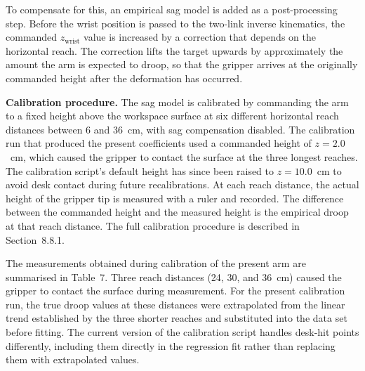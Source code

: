 To compensate for this, an empirical sag model is added as a 
post-processing step. Before the wrist position is passed to the 
two-link inverse kinematics, the commanded $z_{\mathrm{wrist}}$ 
value is increased by a correction that depends on the horizontal 
reach. The correction lifts the target upwards by approximately 
the amount the arm is expected to droop, so that the gripper 
arrives at the originally commanded height after the deformation 
has occurred.

\textbf{Calibration procedure.} The sag model is calibrated by
commanding the arm to a fixed height above the workspace surface
at six different horizontal reach distances between 6 and
36~cm, with sag compensation disabled. The calibration run
that produced the present coefficients used a commanded height
of $z = 2.0$~cm, which caused the gripper to contact the
surface at the three longest reaches. The calibration script's
default height has since been raised to $z = 10.0$~cm to avoid
desk contact during future recalibrations. At each
reach distance, the actual height of the gripper tip is measured 
with a ruler and recorded. The difference between the commanded 
height and the measured height is the empirical droop at that 
reach distance. The full calibration procedure is described in 
Section~8.8.1.

The measurements obtained during calibration of the present arm
are summarised in Table~7. Three reach distances (24, 30, and
36~cm) caused the gripper to contact the surface during
measurement. For the present calibration run, the true droop
values at these distances were extrapolated from the linear
trend established by the three shorter reaches and substituted
into the data set before fitting. The current version of the
calibration script handles desk-hit points differently,
including them directly in the regression fit rather than
replacing them with extrapolated values.

